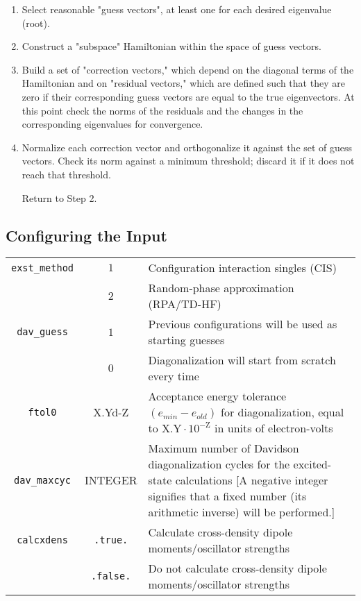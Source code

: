 \documentclass[12pt,letter,footinclude=true,headinclude=true,hyphens,oneside]{book} %
\begin{document}
    \begin{enumerate}
    \item Select reasonable "guess vectors", at least one for each desired eigenvalue (root).
    \item Construct a "subspace" Hamiltonian within the space of guess vectors.
    \item Build a set of "correction vectors," which depend on the diagonal terms of the Hamiltonian and on "residual vectors," which are defined such that they are zero if their corresponding guess vectors are equal to the true eigenvectors. At this point check the norms of the residuals and the changes in the corresponding eigenvalues for convergence.
    \item Normalize each correction vector and orthogonalize it against the set of guess vectors. Check its norm against a minimum threshold; discard it if it does not reach that threshold.
    
    Return to Step 2.
    \end{enumerate}
    
    \subsection{Configuring the Input}
    \label{excited-state-input}
    
    \begin{tabular}{ | c | c | p{7cm} | }
    \hline
    \texttt{exst\_method} & $1$ & Configuration interaction singles (CIS) \\
    & $2$ & Random-phase approximation (RPA/TD-HF) \\ \hline
    \texttt{dav\_guess} & $1$ & Previous configurations will be used as starting guesses \\
    & $0$ & Diagonalization will start from scratch every time \\ \hline
    \texttt{ftol0} & X.Yd-Z & Acceptance energy tolerance $\left ( e_{min} - e_{old} \right )$ for diagonalization, equal to $\mathrm{X.Y} \cdot 10^{-\mathrm{Z}}$ in units of electron-volts \\ \hline
    \texttt{dav\_maxcyc} & INTEGER & Maximum number of Davidson diagonalization cycles for the excited-state calculations [A negative integer signifies that a fixed number (its arithmetic inverse) will be performed.] \\ \hline
    \texttt{calcxdens} & \texttt{.true.} & Calculate cross-density dipole moments/oscillator strengths \\
    & \texttt{.false.} & Do not calculate cross-density dipole moments/oscillator strengths \\
    \hline
    \end{tabular}
    
\end{document}
